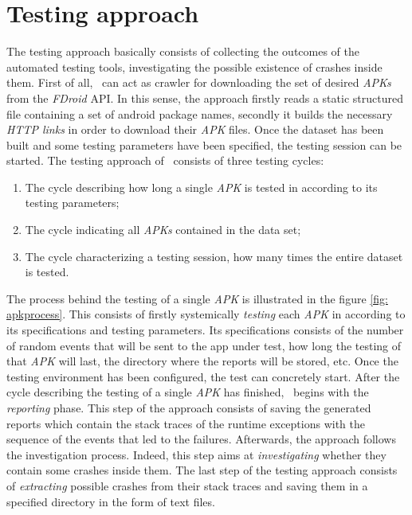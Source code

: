 \section{Testing approach}
\label{approach:testing}
The testing approach basically consists of collecting the outcomes of the automated testing tools, investigating the possible existence of crashes inside them.
First of all, \toolname\ can act as crawler for downloading the set of desired \textit{APKs} from the \textit{FDroid} API. 
In this sense, the approach firstly reads a static structured file containing a set of android package names, secondly it builds the necessary \textit{HTTP links} in order to download their \textit{APK} files. 
Once the dataset has been built and some testing parameters have been specified, the testing session can be started. 
The testing approach of \toolname\ consists of three testing cycles: 
\begin{enumerate}
\item The cycle describing how long a single \textit{APK} is tested in according to its testing parameters;
\item The cycle indicating all \textit{APKs} contained in the data set;
\item The cycle characterizing a testing session, \ie how many times the entire dataset is tested. 
\end{enumerate}
The process behind the testing of a single \textit{APK} is illustrated in the figure \ref{fig: apkprocess}.
This consists of firstly systemically \textit{testing} each \textit{APK} in according to its specifications and testing parameters.
Its specifications consists of the number of random events that will be sent to the app under test, how long the testing of that \textit{APK} will last, the directory where the reports will be stored, etc. 
Once the testing environment has been configured, the test can concretely start. 
After the cycle describing the testing of a single \textit{APK} has finished, \toolname\ begins with the \textit{reporting} phase. 
This step of the approach consists of saving the generated reports which contain the stack traces of the runtime exceptions with the sequence of the events that led to the failures. Afterwards, the approach follows the investigation process. Indeed, this step aims at \textit{investigating} whether they contain some crashes inside them. 
The last step of the testing approach consists of \textit{extracting} possible crashes from their stack traces and saving them in a specified directory in the form of text files. 


